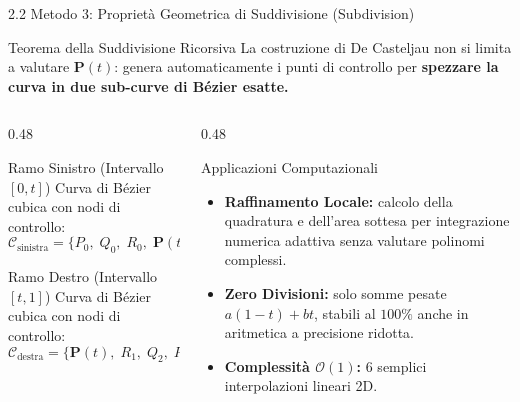 \documentclass[aspectratio=169, 10pt]{beamer}
\begin{document}
\begin{frame}{2.2 Metodo 3: Proprietà Geometrica di Suddivisione (Subdivision)}
    \begin{block}{Teorema della Suddivisione Ricorsiva}
        La costruzione di De Casteljau non si limita a valutare $\mathbf{P}(t)$: genera automaticamente i punti di controllo per \textbf{spezzare la curva in due sub-curve di Bézier esatte.}
    \end{block}
    \begin{columns}[T]
        \begin{column}{0.48\textwidth}
            \begin{exampleblock}{Ramo Sinistro (Intervallo $[0, t]$)}
                Curva di Bézier cubica con nodi di controllo:
                $$\mathcal{C}_{\text{sinistra}} = \{P_0, \; Q_0, \; R_0, \; \mathbf{P}(t)\}$$
            \end{exampleblock}
            \vspace{0.1cm}
            \begin{alertblock}{Ramo Destro (Intervallo $[t, 1]$)}
                Curva di Bézier cubica con nodi di controllo:
                $$\mathcal{C}_{\text{destra}} = \{\mathbf{P}(t), \; R_1, \; Q_2, \; P_3\}$$
            \end{alertblock}
        \end{column}
        \begin{column}{0.48\textwidth}
            \begin{block}{Applicazioni Computazionali}
                \footnotesize
                \begin{itemize}
                    \item \textbf{Raffinamento Locale:} calcolo della quadratura e dell'area sottesa per integrazione numerica adattiva senza valutare polinomi complessi.
                    \item \textbf{Zero Divisioni:} solo somme pesate $a(1-t) + bt$, stabili al $100\%$ anche in aritmetica a precisione ridotta.
                    \item \textbf{Complessità $\mathcal{O}(1)$:} 6 semplici interpolazioni lineari 2D.
                \end{itemize}
            \end{block}
        \end{column}
    \end{columns}
\end{frame}
\end{document}
